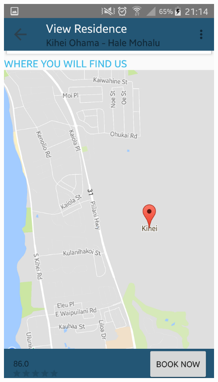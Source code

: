 \documentclass[12pt]{article}
\begin{document}
	\begin{figure}
		\begin{center}
			\includegraphics[scale=0.12, keepaspectratio]{09-Residence02.png} 

\end{center}
\end{figure}
\end{document}
